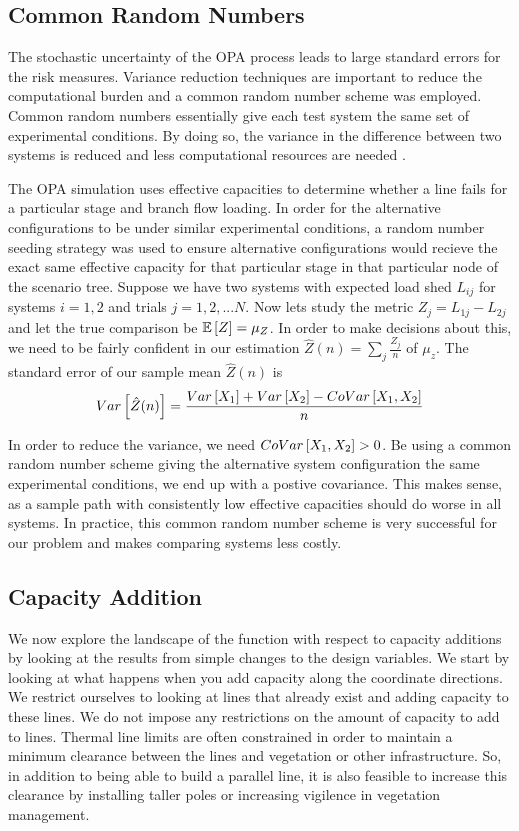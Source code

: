 \subsection{Common Random Numbers}
The stochastic uncertainty of the OPA process leads to large standard errors for the risk measures.  Variance reduction techniques are important to reduce the computational burden and a common random number scheme was employed.  Common random numbers essentially give each test system the same set of experimental conditions.  By doing so, the variance in the difference between two systems is reduced and less computational resources are needed \cite{law_2007}.

The OPA simulation uses effective capacities to determine whether a line fails for a particular stage and branch flow loading.  In order for the alternative configurations to be under similar experimental conditions, a random number seeding strategy was used to ensure alternative configurations would recieve the exact same effective capacity for that particular stage in that particular node of the scenario tree.  Suppose we have two systems with expected load shed $L_{ij}$ for systems $i=1,2$ and trials $j=1,2,...N$.  Now lets study the metric $Z_j = L_{1j} - L_{2j}$ and let the true comparison be $\mathbb{E}\left[ Z \right]=\mu_Z$.  In order to make decisions about this, we need to be fairly confident in our estimation $\hat{Z}(n)=\sum_j \frac{Z_j}{n}$ of $\mu_z$.  The standard error of our sample mean $\hat{Z}(n)$ is
\begin{equation}
Var\left[  \hat{Z}(n)  \right] = \frac{ Var\left[ X_1 \right] + Var\left[ X_2 \right] - CoVar\left[ X_1, X_2 \right] }{n}
\end{equation}

In order to reduce the variance, we need $CoVar\left[ X_1, X_2 \right]>0$.  Be using a common random number scheme giving the alternative system configuration the same experimental conditions, we end up with a postive covariance.  This makes sense, as a sample path with consistently low effective capacities should do worse in all systems.  In practice, this common random number scheme is very successful for our problem and makes comparing systems less costly.


\subsection{Capacity Addition}
We now explore the landscape of the function with respect to capacity additions by looking at the results from simple changes to the design variables.  We start by looking at what happens when you add capacity along the coordinate directions.  We restrict ourselves to looking at lines that already exist and adding capacity to these lines.  We do not impose any restrictions on the amount of capacity to add to lines.  Thermal line limits are often constrained in order to maintain a minimum clearance between the lines and vegetation or other infrastructure.  So, in addition to being able to build a parallel line, it is also feasible to increase this clearance by installing taller poles or increasing vigilence in vegetation management.

